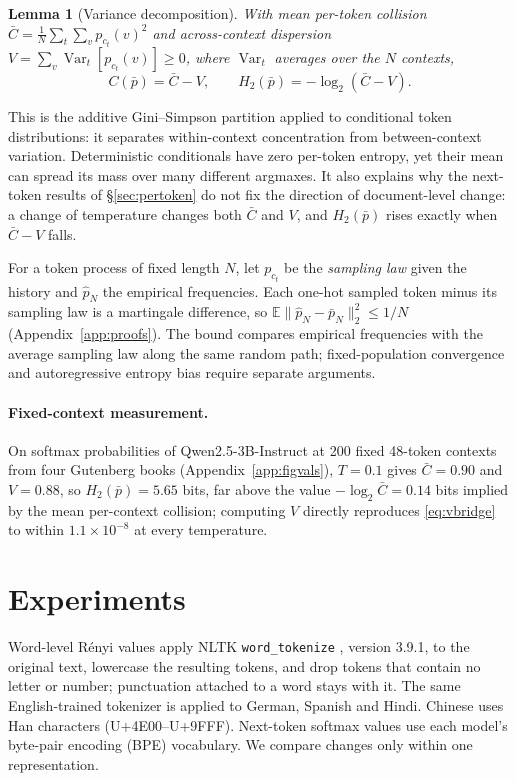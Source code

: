 \documentclass[10pt]{article}
\theoremstyle{plain}
\newtheorem{lemma}{Lemma}
\theoremstyle{definition}
\newcommand{\E}{\mathbb{E}}
\newcommand{\Var}{\operatorname{Var}}
\newcommand{\ph}{\hat p}
\newcommand{\Cbar}{\bar C}
\newcommand{\pbar}{\bar p}
\newcommand{\Htwo}{H_2}
\begin{document}
\begin{lemma}[Variance decomposition]
\label{lem:vbridge}
With mean per-token collision $\Cbar=\frac1N\sum_t\sum_v p_{c_t}(v)^2$ and across-context dispersion $V=\sum_v\Var_t[p_{c_t}(v)]\ge0$, where $\Var_t$ averages over the $N$ contexts,
\begin{equation}
C(\pbar)=\Cbar - V,\qquad \Htwo(\pbar)=-\log_2(\Cbar-V).
\label{eq:vbridge}
\end{equation}
\end{lemma}

This is the additive Gini--Simpson partition \citep{rao1982,lande1996} applied to conditional
token distributions: it separates within-context concentration from between-context variation. Deterministic conditionals have zero per-token entropy, yet their mean
can spread its mass over many different argmaxes. It also explains why the next-token results
of \S\ref{sec:pertoken} do not fix the direction of document-level change: a change of
temperature changes both $\Cbar$ and $V$, and $\Htwo(\pbar)$ rises exactly when
$\Cbar-V$ falls.

For a token process of fixed length $N$, let $p_{c_t}$ be the \emph{sampling law} given the
history and $\ph_N$ the empirical frequencies. Each one-hot sampled token minus its sampling law is
a martingale difference, so $\E\|\ph_N-\pbar_N\|_2^2\le 1/N$ (Appendix~\ref{app:proofs}). The bound compares empirical
frequencies with the average sampling law along the same random path; fixed-population
convergence and autoregressive entropy bias require separate arguments.

\paragraph{Fixed-context measurement.} On softmax probabilities of Qwen2.5-3B-Instruct at 200
fixed 48-token contexts from four Gutenberg books (Appendix~\ref{app:figvals}), $T=0.1$ gives
$\Cbar=0.90$ and $V=0.88$, so $\Htwo(\pbar)=5.65$ bits, far above the value $-\log_2\Cbar=0.14$
bits implied by the mean per-context collision; computing $V$ directly reproduces \eqref{eq:vbridge} to within $1.1\times10^{-8}$ at every temperature.

\section{Experiments}
\label{sec:experiments}

Word-level R\'enyi values apply NLTK \texttt{word\_tokenize} \citep{bird2009nltk}, version 3.9.1,
to the original text, lowercase the resulting tokens, and drop tokens that contain no letter or
number; punctuation attached to a
word stays with it. The same English-trained tokenizer is applied to German, Spanish and Hindi.
Chinese uses Han characters
(U+4E00--U+9FFF). Next-token softmax values use each model's byte-pair encoding (BPE) vocabulary. We
compare changes only within one representation.
\end{document}
